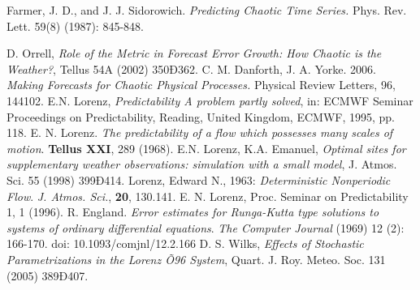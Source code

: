 \documentclass[onecolumn]{article}
\begin{document}
\begin{multicols}{2}
\begin{thebibliography}{9}
                Farmer, J. D., and J. J. Sidorowich. \emph{Predicting Chaotic Time Series.} Phys. Rev. Lett. 59(8) (1987): 845-848.

	 D. Orrell, \emph{Role of the Metric in Forecast Error Growth: How Chaotic is
the Weather?}, Tellus 54A (2002) 350Ð362.
        	C. M. Danforth, J. A. Yorke.  2006. \emph{Making Forecasts for Chaotic Physical Processes.}
		Physical Review Letters, 96, 144102.
	E.N. Lorenz, \emph{Predictability A problem partly solved}, in: ECMWF Seminar Proceedings on Predictability, Reading, United
Kingdom, ECMWF, 1995, pp. 118.
                E. N. Lorenz. \emph{The predictability of a flow which possesses many scales of motion}. {\bf Tellus XXI}, 289 (1968).
	E.N. Lorenz, K.A. Emanuel, \emph{Optimal sites for supplementary weather observations: simulation with a small model}, J. Atmos. Sci.
55 (1998) 399Ð414.
                Lorenz, Edward N., 1963: \emph{Deterministic Nonperiodic Flow}. {\it J. Atmos. Sci.}, {\bf 20}, 130.141.
                E. N. Lorenz, Proc. Seminar on Predictability 1, 1 (1996).
                R. England. \emph{Error estimates for Runga-Kutta type solutions to systems of ordinary differential equations}. {\it The Computer Journal} (1969) 12 (2): 166-170. doi: 10.1093/comjnl/12.2.166
         D. S. Wilks, \emph{Effects of Stochastic Parametrizations in the Lorenz Õ96 System}, Quart. J. Roy. Meteo. Soc. 131 (2005) 389Ð407.


\end{thebibliography}
\end{multicols}
\end{document}
